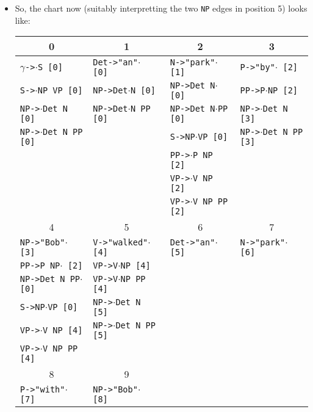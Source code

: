 \documentclass[a4paper]{article}
\begin{document}
\begin{enumerate}
\begin{enumerate}
\begin{enumerate}
\begin{itemize}
\item So, the chart now (suitably interpretting the two \texttt{NP} edges in position 5) looks like:
\begin{table}[ht]
\centering
\begin{tabular}{l|l|l|l}
\multicolumn{1}{c}{0} & \multicolumn{1}{c}{1} &\multicolumn{1}{c}{2} & \multicolumn{1}{c}{3} \\
\hline
$\gamma$\texttt{->}$\cdot$\texttt{S [0]} & \texttt{Det->"an"}$\cdot$\texttt{ [0]} & \texttt{N->"park"}$\cdot$\texttt{ [1]} & \texttt{P->"by"}$\cdot$\texttt{ [2]} \\
\texttt{S->}$\cdot$\texttt{NP VP [0]} & \texttt{NP->Det}$\cdot$\texttt{N [0]} & \texttt{NP->Det N}$\cdot$\texttt{ [0]} & \texttt{PP->P}$\cdot$\texttt{NP [2]} \\
\texttt{NP->}$\cdot$\texttt{Det N [0]} & \texttt{NP->Det}$\cdot$\texttt{N PP [0]} & \texttt{NP->Det N}$\cdot$\texttt{PP [0]} & \texttt{NP->}$\cdot$\texttt{Det N [3]} \\
\texttt{NP->}$\cdot$\texttt{Det N PP [0]} & & \texttt{S->NP}$\cdot$\texttt{VP [0]} & \texttt{NP->}$\cdot$\texttt{Det N PP [3]} \\
 & & \texttt{PP->}$\cdot$\texttt{P NP [2]} & \\
 & & \texttt{VP->}$\cdot$\texttt{V NP [2]} & \\
 & & \texttt{VP->}$\cdot$\texttt{V NP PP [2]} & \\
\hline
\multicolumn{1}{c}{4} & \multicolumn{1}{c}{5} & \multicolumn{1}{c}{6} & \multicolumn{1}{c}{7} \\
\hline
\texttt{NP->"Bob"}$\cdot$\texttt{ [3]} & \texttt{V->"walked"}$\cdot$\texttt{ [4]} & \texttt{Det->"an"}$\cdot$\texttt{ [5]} & \texttt{N->"park"}$\cdot$\texttt{ [6]} \\
\texttt{PP->P NP}$\cdot$\texttt{ [2]} & \texttt{VP->V}$\cdot$\texttt{NP [4]} & & \\
\texttt{NP->Det N PP}$\cdot$\texttt{ [0]} & \texttt{VP->V}$\cdot$\texttt{NP PP [4]} & & \\
\texttt{S->NP}$\cdot$\texttt{VP [0]} & \texttt{NP->}$\cdot$\texttt{Det N [5]} & & \\
\texttt{VP->}$\cdot$\texttt{V NP [4]} & \texttt{NP->}$\cdot$\texttt{Det N PP [5]} & & \\
\texttt{VP->}$\cdot$\texttt{V NP PP [4]} & & & \\
\hline
\multicolumn{1}{c}{8} & \multicolumn{1}{c}{9} & \multicolumn{1}{c}{} & \\
\hline
\texttt{P->"with"}$\cdot$\texttt{ [7]} & \texttt{NP->"Bob"}$\cdot$\texttt{ [8]} & & \\

\end{tabular}
\end{table}
\end{itemize}
\end{enumerate}
\end{enumerate}
\end{enumerate}
\end{document}
